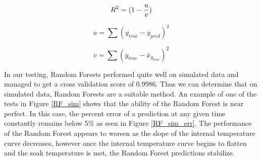 \begin{equation}
\label{r2}
    R^{2} = (1-\frac{u}{v}) \\
\end{equation}

\begin{equation}
        u = \sum (y_{true} - y_{pred})^{2}
\end{equation}

\begin{equation}
    v = \sum (y_{true} - \bar{x}_{y_{true}})^{2}
\end{equation}

In our testing, Random Forests performed quite well on simulated data and managed to get a cross validation score of 0.9986. Thus we can determine that on simulated data, Random Forests are a suitable method. An example of one of the tests in Figure \ref{RF_sim} shows that the ability of the Random Forest is near perfect. In this case, the percent error of a prediction at any given time constantly remains below 5\% as seen in Figure \ref{RF_sim_err}. The performance of the Random Forest appears to worsen as the slope of the internal temperature curve decreases, however once the internal temperature curve begins to flatten and the soak temperature is met, the Random Forest predictions stabilize.

